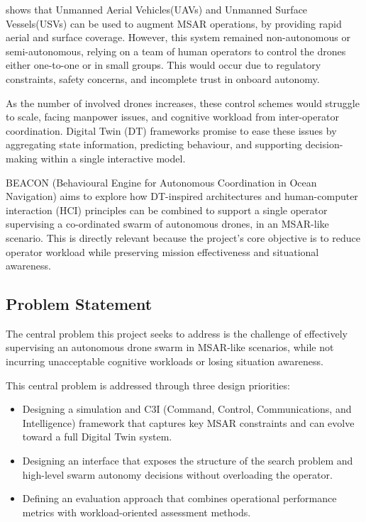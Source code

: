 \cite{7761074} shows that Unmanned Aerial Vehicles(UAVs) and Unmanned Surface Vessels(USVs) can be used to augment MSAR operations, by providing rapid aerial and surface coverage.
However, this system remained non-autonomous or semi-autonomous, relying on a team of human operators to control the drones either one-to-one or in small groups.
This would occur due to regulatory constraints, safety concerns, and incomplete trust in onboard autonomy.

As the number of involved drones increases, these control schemes would struggle to scale, facing manpower issues, and cognitive workload from inter-operator coordination.
Digital Twin (DT) frameworks promise to ease these issues by aggregating state information, predicting behaviour, and supporting decision-making within a single interactive model.

BEACON (Behavioural Engine for Autonomous Coordination in Ocean Navigation) aims to explore how DT-inspired architectures and human-computer interaction (HCI) principles can be combined to support a single operator supervising a co-ordinated swarm of autonomous drones, in an MSAR-like scenario.
This is directly relevant because the project's core objective is to reduce operator workload while preserving mission effectiveness and situational awareness.

\subsection{Problem Statement}\label{subsec:problem-statement}
The central problem this project seeks to address is the challenge of effectively supervising an autonomous drone swarm in MSAR-like scenarios, while not incurring unacceptable cognitive workloads or losing situation awareness.

This central problem is addressed through three design priorities:

\begin{itemize}
    \item Designing a simulation and C3I (Command, Control, Communications, and Intelligence) framework that captures key MSAR constraints and can evolve toward a full Digital Twin system.
    \item Designing an interface that exposes the structure of the search problem and high-level swarm autonomy decisions without overloading the operator.
    \item Defining an evaluation approach that combines operational performance metrics with workload-oriented assessment methods.
\end{itemize}


